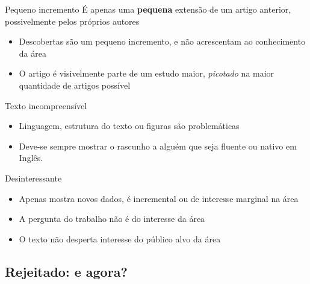 \documentclass{beamer}
\begin{document}
\begin{frame}{Pequeno incremento}
  É apenas uma {\bf pequena} extensão de um artigo anterior,
  possivelmente pelos próprios autores
  \begin{itemize}
  \item Descobertas são um pequeno incremento, e não acrescentam ao
    conhecimento da área
  \item O artigo é visivelmente parte de um estudo maior, {\em
      picotado} na maior quantidade de artigos possível
  \end{itemize}
\end{frame}

\begin{frame}{Texto incompreensível}
  \begin{itemize}
  \item Linguagem, estrutura do texto ou figuras são problemáticas
  \item Deve-se sempre mostrar o rascunho a alguém que seja fluente ou
    nativo em Inglês.
  \end{itemize}
\end{frame}

\begin{frame}{Desinteressante}
  \begin{itemize}
  \item Apenas mostra novos dados, é incremental ou de interesse
    marginal na área
  \item A pergunta do trabalho não é do interesse da área
  \item O texto não desperta interesse do público alvo da área
  \end{itemize}
\end{frame}

\subsection{Rejeitado: e agora?}

\end{document}
